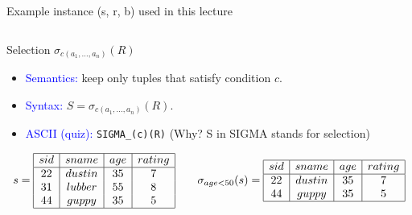 \documentclass[10pt,aspectratio=169]{beamer}
\newcommand{\select}{\sigma}
\begin{document}
\begin{frame}{Example instance (s, r, b) used in this lecture}
\begin{columns}[T,onlytextwidth]
\end{columns}
\end{frame}


\begin{frame}{Selection \(\select_{c(a_1,\dots,a_n)}(R)\)}
\begin{itemize}
  \item \textcolor{blue}{Semantics:} keep only tuples that satisfy condition \(c\).
  \item \textcolor{blue}{Syntax:} \(S=\select_{c(a_1,\dots,a_n)}(R)\).
  \item \textcolor{blue}{ASCII (quiz):} \texttt{SIGMA\_(c)(R)}    (Why? S in SIGMA stands for selection)
\end{itemize}

\vspace{0.4em}
\small
\[
s=\begin{array}{|c|c|c|c|}\hline
sid&sname&age&rating\\\hline
22&dustin&35&7\\
31&lubber&55&8\\
44&guppy&35&5\\\hline
\end{array}
\qquad
\select_{age<50}(s)=
\begin{array}{|c|c|c|c|}\hline
sid&sname&age&rating\\\hline
22&dustin&35&7\\
44&guppy&35&5\\\hline
\end{array}
\]
\end{frame}
\end{document}
